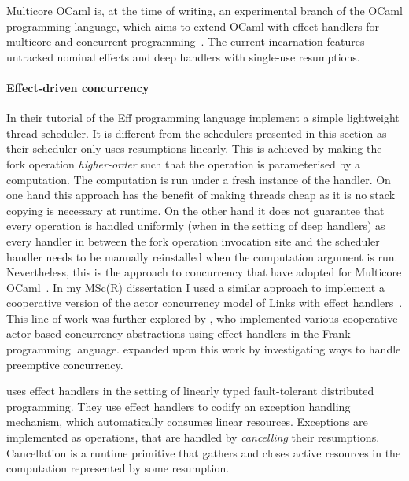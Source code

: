 \documentclass[12pt,phd,lfcs,twoside,openright,logo,leftchapter,normalheadings]{infthesis}
\theoremstyle{plain}
\theoremstyle{definition}
\begin{document}
Multicore OCaml is, at the time of writing, an experimental branch of
the OCaml programming language, which aims to extend OCaml with effect
handlers for multicore and concurrent
programming~\cite{DolanWM14,DolanWSYM15}. The current incarnation
features untracked nominal effects and deep handlers with single-use
resumptions.


\paragraph{Effect-driven concurrency}
In their tutorial of the Eff programming language \citet{BauerP15}
implement a simple lightweight thread scheduler. It is different from
the schedulers presented in this section as their scheduler only uses
resumptions linearly. This is achieved by making the fork operation
\emph{higher-order} such that the operation is parameterised by a
computation. The computation is run under a fresh instance of the
handler. On one hand this approach has the benefit of making threads
cheap as it is no stack copying is necessary at runtime. On the other
hand it does not guarantee that every operation is handled uniformly
(when in the setting of deep handlers) as every handler in between the
fork operation invocation site and the scheduler handler needs to be
manually reinstalled when the computation argument is
run. Nevertheless, this is the approach to concurrency that
\citet{DolanWSYM15} have adopted for Multicore
OCaml~\cite{DolanWSYM15}.
%
In my MSc(R) dissertation I used a similar approach to implement a
cooperative version of the actor concurrency model of Links with
effect handlers~\cite{Hillerstrom16}.
%
This line of work was further explored by \citet{Convent17}, who
implemented various cooperative actor-based concurrency abstractions
using effect handlers in the Frank programming
language. \citet{Poulson20} expanded upon this work by investigating
ways to handle preemptive concurrency.

\citet{FowlerLMD19} uses effect handlers in the setting of linearly
typed fault-tolerant distributed programming. They use effect handlers
to codify an exception handling mechanism, which automatically
consumes linear resources. Exceptions are implemented as operations,
that are handled by \emph{cancelling} their resumptions. Cancellation
is a runtime primitive that gathers and closes active resources in the
computation represented by some resumption.
\end{document}
